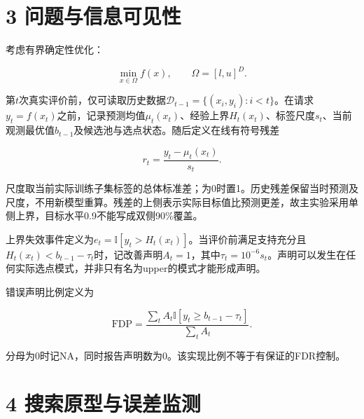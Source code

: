 \documentclass[11pt,a4paper]{article}
\begin{document}
\par{}\noindent\begin{minipage}{\linewidth}

\hypertarget{ux95eeux9898ux4e0eux4fe1ux606fux53efux89c1ux6027}{%
\section{3
问题与信息可见性}\label{ux95eeux9898ux4e0eux4fe1ux606fux53efux89c1ux6027}}

考虑有界确定性优化：

\[
\min_{x\in\Omega} f(x),\qquad \Omega=[l,u]^D.
\]

\end{minipage}\par

\par\noindent\begin{minipage}{\linewidth}

第\(t\)次真实评价前，仅可读取历史数据\(\mathcal D_{t-1}=\{(x_i,y_i):i<t\}\)。在请求\(y_t=f(x_t)\)之前，记录预测均值\(\mu_t(x_t)\)、经验上界\(H_t(x_t)\)、标签尺度\(s_t\)、当前观测最优值\(b_{t-1}\)及候选池与选点状态。随后定义在线有符号残差

\[
r_t=\frac{y_t-\mu_t(x_t)}{s_t}.
\]

\end{minipage}\par

尺度取当前实际训练子集标签的总体标准差；为0时置1。历史残差保留当时预测及尺度，不用新模型重算。残差的上侧表示实际目标值比预测更差，故主实验采用单侧上界，目标水平0.9不能写成双侧90\%覆盖。

上界失效事件定义为\(e_t=\mathbb I[y_t>H_t(x_t)]\)。当评价前满足支持充分且\(H_t(x_t)<b_{t-1}-\tau_t\)时，记改善声明\(A_t=1\)，其中\(\tau_t=10^{-6}s_t\)。声明可以发生在任何实际选点模式，并非只有名为upper的模式才能形成声明。

\par\noindent\begin{minipage}{\linewidth}

错误声明比例定义为

\[
\mathrm{FDP}=\frac{\sum_t A_t\mathbb I[y_t\ge b_{t-1}-\tau_t]}{\sum_t A_t}.
\]

\end{minipage}\par

分母为0时记NA，同时报告声明数为0。该实现比例不等于有保证的FDR控制。

\hypertarget{ux641cux7d22ux539fux578bux4e0eux8befux5deeux76d1ux6d4b}{%
\section{4
搜索原型与误差监测}\label{ux641cux7d22ux539fux578bux4e0eux8befux5deeux76d1ux6d4b}}
\end{document}
